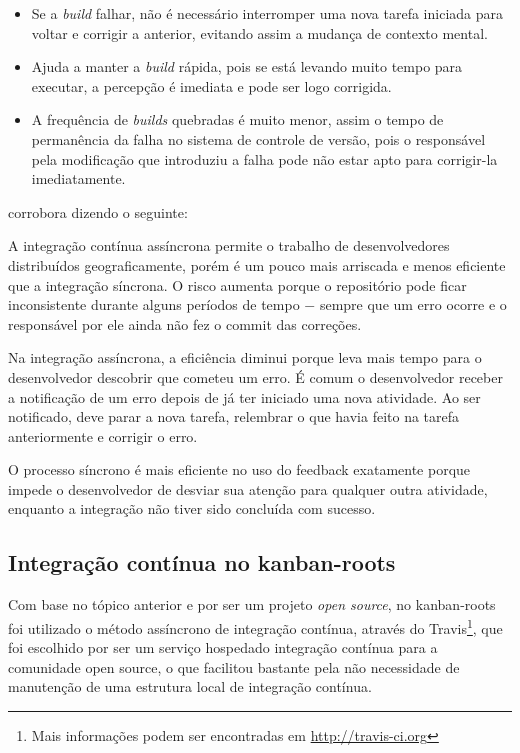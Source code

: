 \begin{itemize}
  \item Se a \textit{build} falhar, não é necessário interromper uma nova tarefa iniciada para voltar e corrigir a anterior, evitando assim a mudança de contexto mental.
  \item Ajuda a manter a \textit{build} rápida, pois se está levando muito tempo para executar, a percepção é imediata e pode ser logo corrigida.
  \item A frequência de \textit{builds} quebradas é muito menor, assim o tempo de permanência da falha no sistema de controle de versão, pois o responsável pela modificação que introduziu a falha pode não estar apto para corrigir-la imediatamente.
\end{itemize}

 corrobora dizendo o seguinte:

\begin{citacao}
A integração contínua assíncrona permite o trabalho de desenvolvedores distribuídos geograficamente, porém é um pouco mais arriscada e menos eficiente que a integração síncrona. O risco aumenta porque o repositório pode ficar inconsistente durante alguns períodos de tempo $-$ sempre que um erro ocorre e o responsável por ele ainda não fez o commit das correções.

Na integração assíncrona, a eficiência diminui porque leva mais tempo para o desenvolvedor descobrir que cometeu um erro. É comum o desenvolvedor receber a notificação de um erro depois de já ter iniciado uma nova atividade. Ao ser notificado, deve parar a nova tarefa, relembrar o que havia feito na tarefa anteriormente e corrigir o erro.

O processo síncrono é mais eficiente no uso do feedback exatamente porque impede o desenvolvedor de desviar sua atenção para qualquer outra atividade, enquanto a integração não tiver sido concluída com sucesso.
\end{citacao}


\subsection{Integração contínua no kanban-roots} %
\label{sub:integracao_continua_no_kanban}

Com base no tópico anterior e por ser um projeto \textit{open source}, no kanban-roots foi utilizado o método assíncrono de integração contínua, através do Travis\footnote{Mais informações podem ser encontradas em \url{http://travis-ci.org}}, que foi escolhido por ser um serviço hospedado integração contínua para a comunidade open source, o que facilitou bastante pela não necessidade de manutenção de uma estrutura local de integração contínua.

